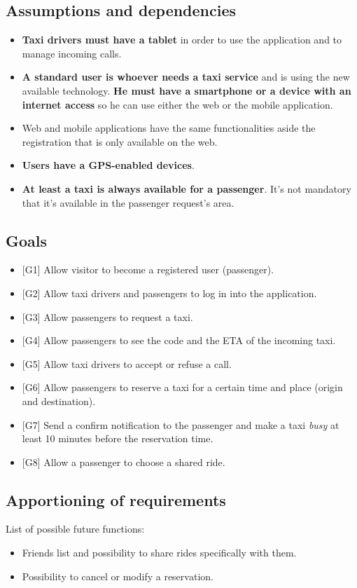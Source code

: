 \documentclass{article}
\begin{document}
\subsection{Assumptions and dependencies}
\begin{itemize}
\item \textbf{Taxi drivers must have a tablet} in order to use the application and to manage incoming calls.
\item \textbf{A standard user is whoever needs a taxi service} and is using the new available technology. \textbf{He must have a smartphone or a device with an internet access} so he can use either the web or the mobile application.
\item Web and mobile applications have the same functionalities aside the registration that is only available on the web.
\item \textbf{Users have a GPS-enabled devices}.
\item \textbf{At least a taxi is always available for a passenger}. It's not mandatory that it's available in the passenger request's area.
\end{itemize}

\subsection{Goals}
\begin{itemize}
\item {[}G1{]} Allow visitor to become a registered user (passenger).
\item {[}G2{]} Allow taxi drivers and passengers to log in into the application.
\item {[}G3{]} Allow passengers to request a taxi.
\item {[}G4{]} Allow passengers to see the code and the ETA of the incoming taxi.
\item {[}G5{]} Allow taxi drivers to accept or refuse a call.
\item {[}G6{]} Allow passengers to reserve a taxi for a certain time and place (origin and destination).
\item {[}G7{]} Send a confirm notification to the passenger and make a taxi \textit{busy} at least 10 minutes before the reservation time.
\item {[}G8{]} Allow a passenger to choose a shared ride.
\end{itemize}

\subsection{Apportioning of requirements}
List of possible future functions:
\begin{itemize}
\item Friends list and possibility to share rides specifically with them.
\item Possibility to cancel or modify a reservation.
\end{itemize}
\end{document}
